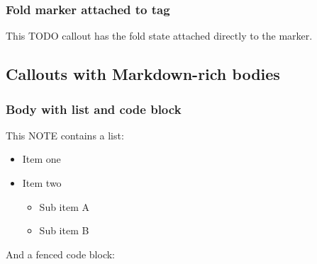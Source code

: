 \subsubsection{Fold marker attached to
tag}\label{fold-marker-attached-to-tag}

\begin{tcolorbox}[breakable,colback=yellow!5!white,colframe=yellow!50!black,left=3mm,boxed title style={left=1mm},title={\hspace*{-2.5mm}\iconTodo\; TODO}]

This TODO callout has the fold state attached directly to the marker.

\end{tcolorbox}

\subsection{Callouts with Markdown-rich
bodies}\label{callouts-with-markdown-rich-bodies}

\subsubsection{Body with list and code
block}\label{body-with-list-and-code-block}

\begin{tcolorbox}[breakable,colback=ocGryBack,colframe=ocGryFrame,coltitle=ocGryTitle,left=3mm,boxed title style={left=1mm},title={\hspace*{-2.5mm}\iconNote\; NOTE with list and code}]

This NOTE contains a list:

\begin{itemize}
\tightlist
\item
  Item one
\item
  Item two

  \begin{itemize}
  \tightlist
  \item
    Sub item A
  \item
    Sub item B
  \end{itemize}
\end{itemize}

And a fenced code block:

\begin{Shaded}
\begin{Highlighting}[]
 
\end{Highlighting}
\end{Shaded}

\end{tcolorbox}

